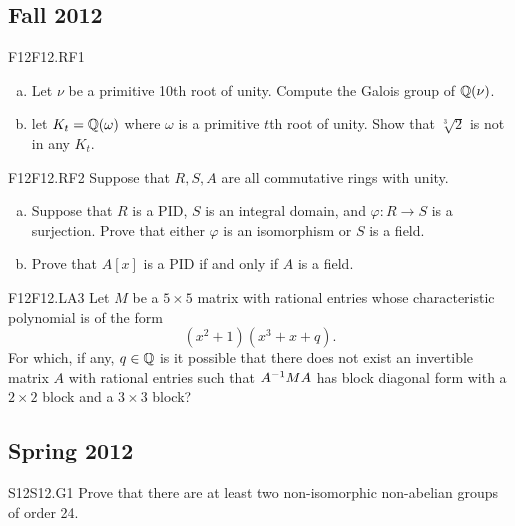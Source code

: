 \documentclass[../AlgebraQualSolutions.tex]{subfiles}
\begin{document}

\subsection{Fall 2012}

\begin{prob}{F12}{F12.RF1}
\begin{enumerate}[(a)]
\item Let $\nu$ be a primitive 10th root of unity. Compute the Galois group of $\mathbb{Q}(\nu)$.
\item let $K_t = \mathbb{Q}(\omega)$ where $\omega$ is a primitive $t$th root of unity. Show that $\sqrt[3]{2}$ is not in any $K_t$.
\end{enumerate}
\end{prob}

\begin{prob}{F12}{F12.RF2}
Suppose that $R,S,A$ are all commutative rings with unity.
\begin{enumerate}[(a)]
\item Suppose that $R$ is a PID, $S$ is an integral domain, and $\varphi:R \to S$ is a surjection. Prove that either $\varphi$ is an isomorphism or $S$ is a field.
\item Prove that $A[x]$ is a PID if and only if $A$ is a field.
\end{enumerate}
\end{prob}

\begin{prob}{F12}{F12.LA3}
Let $M$ be a $5 \times 5$ matrix with rational entries whose characteristic polynomial is of the form
	\[(x^2+1)(x^3+x+q).\]
For which, if any, $q \in \mathbb{Q}$ is it possible that there does not exist an invertible matrix $A$ with rational entries such that $A^{-1} M A$ has block diagonal form with a $2 \times 2$ block and a $3 \times 3$ block?
\end{prob}

\subsection{Spring 2012}


\begin{prob}{S12}{S12.G1}
	Prove that there are at least two non-isomorphic non-abelian groups of order 24.
\end{prob}
\end{document}
